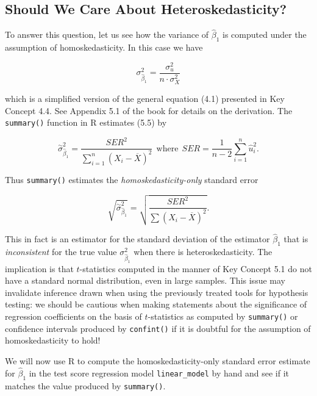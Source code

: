 \documentclass[]{book}
\theoremstyle{definition}
\theoremstyle{definition}
\theoremstyle{definition}
\theoremstyle{remark}
\begin{document}
\subsection*{Should We Care About
Heteroskedasticity?}\label{should-we-care-about-heteroskedasticity}

To answer this question, let us see how the variance of \(\hat\beta_1\)
is computed under the assumption of homoskedasticity. In this case we
have

\[ \sigma^2_{\hat\beta_1} = \frac{\sigma^2_u}{n \cdot \sigma^2_X} \tag{5.5} \]

which is a simplified version of the general equation (4.1) presented in
Key Concept 4.4. See Appendix 5.1 of the book for details on the
derivation. The \texttt{summary()} function in R estimates (5.5) by

\[ \overset{\sim}{\sigma}^2_{\hat\beta_1} = \frac{SER^2}{\sum_{i=1}^n (X_i - \overline{X})^2} \ \ \text{where} \ \ SER=\frac{1}{n-2} \sum_{i=1}^n \hat u_i^2. \]

Thus \texttt{summary()} estimates the \emph{homoskedasticity-only}
standard error

\[ \sqrt{ \overset{\sim}{\sigma}^2_{\hat\beta_1} } = \sqrt{ \frac{SER^2}{\sum(X_i - \overline{X})^2} }. \]

This in fact is an estimator for the standard deviation of the estimator
\(\hat{\beta}_1\) that is \emph{inconsistent} for the true value
\(\sigma^2_{\hat\beta_1}\) when there is heteroskedasticity. The
implication is that \(t\)-statistics computed in the manner of Key
Concept 5.1 do not have a standard normal distribution, even in large
samples. This issue may invalidate inference drawn when using the
previously treated tools for hypothesis testing: we should be cautious
when making statements about the significance of regression coefficients
on the basis of \(t\)-statistics as computed by \texttt{summary()} or
confidence intervals produced by \texttt{confint()} if it is doubtful
for the assumption of homoskedasticity to hold!

We will now use R to compute the homoskedasticity-only standard error
estimate for \(\hat{\beta}_1\) in the test score regression model
\texttt{linear\_model} by hand and see if it matches the value produced
by \texttt{summary()}.
\end{document}
